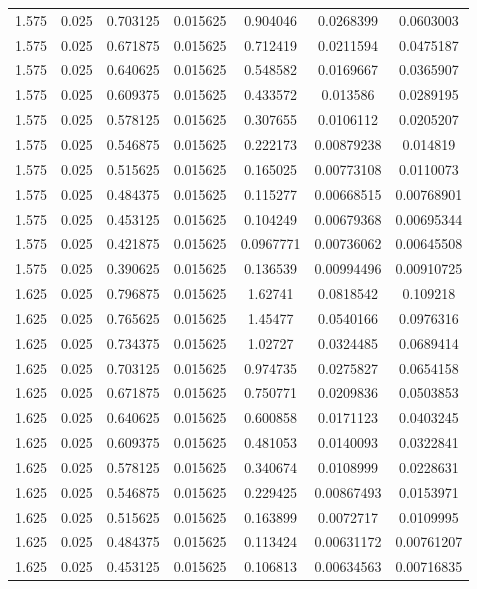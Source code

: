 \begin{flushleft}
\begin{longtable}{ccccccc}
1.575 & 0.025 & 0.703125 & 0.015625 & 0.904046 & 0.0268399 & 0.0603003  \\ 
1.575 & 0.025 & 0.671875 & 0.015625 & 0.712419 & 0.0211594 & 0.0475187  \\ 
1.575 & 0.025 & 0.640625 & 0.015625 & 0.548582 & 0.0169667 & 0.0365907  \\ 
1.575 & 0.025 & 0.609375 & 0.015625 & 0.433572 & 0.013586 & 0.0289195  \\ 
1.575 & 0.025 & 0.578125 & 0.015625 & 0.307655 & 0.0106112 & 0.0205207  \\ 
1.575 & 0.025 & 0.546875 & 0.015625 & 0.222173 & 0.00879238 & 0.014819  \\ 
1.575 & 0.025 & 0.515625 & 0.015625 & 0.165025 & 0.00773108 & 0.0110073  \\ 
1.575 & 0.025 & 0.484375 & 0.015625 & 0.115277 & 0.00668515 & 0.00768901  \\ 
1.575 & 0.025 & 0.453125 & 0.015625 & 0.104249 & 0.00679368 & 0.00695344  \\ 
1.575 & 0.025 & 0.421875 & 0.015625 & 0.0967771 & 0.00736062 & 0.00645508  \\ 
1.575 & 0.025 & 0.390625 & 0.015625 & 0.136539 & 0.00994496 & 0.00910725  \\ 
1.625 & 0.025 & 0.796875 & 0.015625 & 1.62741 & 0.0818542 & 0.109218  \\ 
1.625 & 0.025 & 0.765625 & 0.015625 & 1.45477 & 0.0540166 & 0.0976316  \\ 
1.625 & 0.025 & 0.734375 & 0.015625 & 1.02727 & 0.0324485 & 0.0689414  \\ 
1.625 & 0.025 & 0.703125 & 0.015625 & 0.974735 & 0.0275827 & 0.0654158  \\ 
1.625 & 0.025 & 0.671875 & 0.015625 & 0.750771 & 0.0209836 & 0.0503853  \\ 
1.625 & 0.025 & 0.640625 & 0.015625 & 0.600858 & 0.0171123 & 0.0403245  \\ 
1.625 & 0.025 & 0.609375 & 0.015625 & 0.481053 & 0.0140093 & 0.0322841  \\ 
1.625 & 0.025 & 0.578125 & 0.015625 & 0.340674 & 0.0108999 & 0.0228631  \\ 
1.625 & 0.025 & 0.546875 & 0.015625 & 0.229425 & 0.00867493 & 0.0153971  \\ 
1.625 & 0.025 & 0.515625 & 0.015625 & 0.163899 & 0.0072717 & 0.0109995  \\ 
1.625 & 0.025 & 0.484375 & 0.015625 & 0.113424 & 0.00631172 & 0.00761207  \\ 
1.625 & 0.025 & 0.453125 & 0.015625 & 0.106813 & 0.00634563 & 0.00716835  \\ 

\end{longtable}
\end{flushleft}
